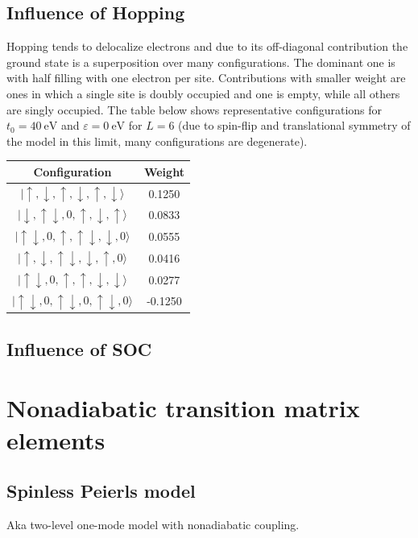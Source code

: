 \documentclass{article}
\begin{document}
\subsection{Influence of Hopping}
Hopping tends to delocalize electrons and due to its off-diagonal contribution the ground state is a superposition over many configurations. The dominant one is with half filling with one electron per site. Contributions with smaller weight are ones in which a single site is doubly occupied and one is empty, while all others are singly occupied. The table below shows representative configurations for $t_0 = \SI{40}{\electronvolt}$ and $\varepsilon = \SI{0}{\electronvolt}$ for $L=6$ (due to spin-flip and translational symmetry of the model in this limit, many configurations are degenerate).
\begin{center}
\begin{tabular}{cc}
	Configuration & Weight\\
	\hline
	$\vert \uparrow,\downarrow,\uparrow,\downarrow,\uparrow,\downarrow\rangle $&  0.1250\\
	$\vert \downarrow,\uparrow\downarrow,0,\uparrow,\downarrow,\uparrow\rangle $&  0.0833\\
	$\vert \uparrow\downarrow,0,\uparrow,\uparrow\downarrow,\downarrow,0\rangle $&  0.0555\\
	$\vert \uparrow,\downarrow,\uparrow\downarrow,\downarrow,\uparrow,0\rangle $&  0.0416\\
	$\vert \uparrow\downarrow,0,\uparrow,\uparrow,\downarrow,\downarrow\rangle $&  0.0277\\
	$\vert \uparrow\downarrow,0,\uparrow\downarrow,0,\uparrow\downarrow,0\rangle$&  -0.1250\\
	\hline
\end{tabular}
\end{center}
\subsection{Influence of SOC}
\section{Nonadiabatic transition matrix elements}
\subsection{Spinless Peierls model}
Aka two-level one-mode model with nonadiabatic coupling. 
\end{document}
